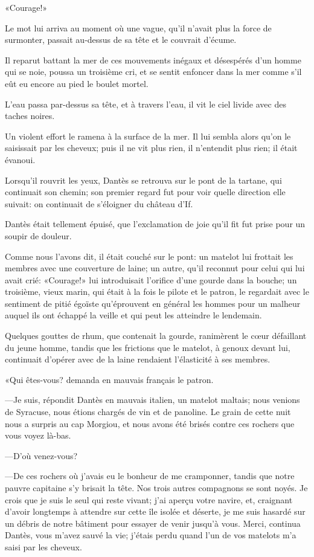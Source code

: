 «Courage!»

Le mot lui arriva au moment où une vague, qu'il n'avait plus la force de surmonter, passait au-dessus de sa tête et le couvrait d'écume.

Il reparut battant la mer de ces mouvements inégaux et désespérés d'un homme qui se noie, poussa un troisième cri, et se sentit enfoncer dans la mer comme s'il eût eu encore au pied le boulet mortel.

L'eau passa par-dessus sa tête, et à travers l'eau, il vit le ciel livide avec des taches noires.

Un violent effort le ramena à la surface de la mer. Il lui sembla alors qu'on le saisissait par les cheveux; puis il ne vit plus rien, il n'entendit plus rien; il était évanoui.

Lorsqu'il rouvrit les yeux, Dantès se retrouva sur le pont de la tartane, qui continuait son chemin; son premier regard fut pour voir quelle direction elle suivait: on continuait de s'éloigner du château d'If.

Dantès était tellement épuisé, que l'exclamation de joie qu'il fit fut prise pour un soupir de douleur.

Comme nous l'avons dit, il était couché sur le pont: un matelot lui frottait les membres avec une couverture de laine; un autre, qu'il reconnut pour celui qui lui avait crié: «Courage!» lui introduisait l'orifice d'une gourde dans la bouche; un troisième, vieux marin, qui était à la fois le pilote et le patron, le regardait avec le sentiment de pitié égoïste qu'éprouvent en général les hommes pour un malheur auquel ils ont échappé la veille et qui peut les atteindre le lendemain.

Quelques gouttes de rhum, que contenait la gourde, ranimèrent le cœur défaillant du jeune homme, tandis que les frictions que le matelot, à genoux devant lui, continuait d'opérer avec de la laine rendaient l'élasticité à ses membres.

«Qui êtes-vous? demanda en mauvais français le patron.

—Je suis, répondit Dantès en mauvais italien, un matelot maltais; nous venions de Syracuse, nous étions chargés de vin et de panoline. Le grain de cette nuit nous a surpris au cap Morgiou, et nous avons été brisés contre ces rochers que vous voyez là-bas.

—D'où venez-vous?

—De ces rochers où j'avais eu le bonheur de me cramponner, tandis que notre pauvre capitaine s'y brisait la tête. Nos trois autres compagnons se sont noyés. Je crois que je suis le seul qui reste vivant; j'ai aperçu votre navire, et, craignant d'avoir longtemps à attendre sur cette île isolée et déserte, je me suis hasardé sur un débris de notre bâtiment pour essayer de venir jusqu'à vous. Merci, continua Dantès, vous m'avez sauvé la vie; j'étais perdu quand l'un de vos matelots m'a saisi par les cheveux.

